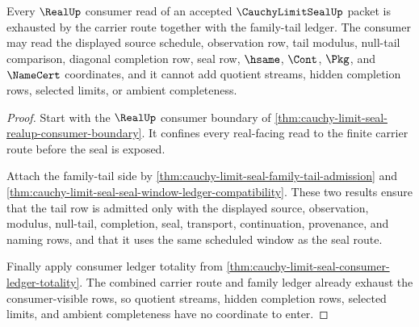\begin{theorem}
\label{thm:cauchy-limit-seal-real-consumer-family-exhaustion}
Every $\RealUp$ consumer read of an accepted $\CauchyLimitSealUp$ packet is exhausted by the carrier route together with the family-tail ledger. The consumer may read the displayed source schedule, observation row, tail modulus, null-tail comparison, diagonal completion row, seal row, $\hsame$, $\Cont$, $\Pkg$, and $\NameCert$ coordinates, and it cannot add quotient streams, hidden completion rows, selected limits, or ambient completeness.
\end{theorem}
\begin{proof}
Start with the $\RealUp$ consumer boundary of \autoref{thm:cauchy-limit-seal-realup-consumer-boundary}. It confines every real-facing read to the finite carrier route before the seal is exposed.

Attach the family-tail side by \autoref{thm:cauchy-limit-seal-family-tail-admission} and \autoref{thm:cauchy-limit-seal-seal-window-ledger-compatibility}. These two results ensure that the tail row is admitted only with the displayed source, observation, modulus, null-tail, completion, seal, transport, continuation, provenance, and naming rows, and that it uses the same scheduled window as the seal route.

Finally apply consumer ledger totality from \autoref{thm:cauchy-limit-seal-consumer-ledger-totality}. The combined carrier route and family ledger already exhaust the consumer-visible rows, so quotient streams, hidden completion rows, selected limits, and ambient completeness have no coordinate to enter.
\end{proof}

